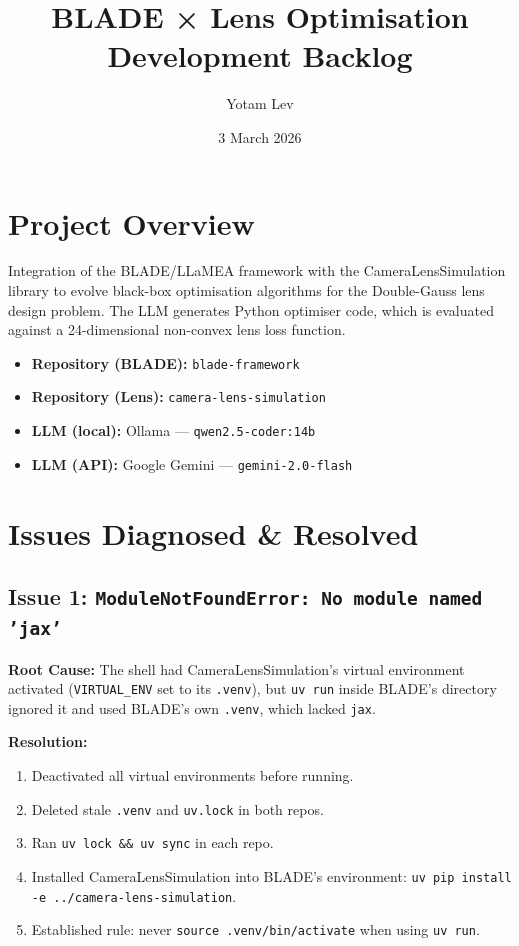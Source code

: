 \documentclass[a4paper,11pt]{article}
\title{\textbf{BLADE × Lens Optimisation} \\ Development Backlog}
\author{Yotam Lev}
\date{3 March 2026}
\begin{document}
\maketitle
\tableofcontents
\newpage

\section{Project Overview}

Integration of the BLADE/LLaMEA framework with the CameraLensSimulation
library to evolve black-box optimisation algorithms for the Double-Gauss
lens design problem. The LLM generates Python optimiser code, which is
evaluated against a 24-dimensional non-convex lens loss function.

\begin{itemize}
    \item \textbf{Repository (BLADE):} \texttt{blade-framework}
    \item \textbf{Repository (Lens):} \texttt{camera-lens-simulation}
    \item \textbf{LLM (local):} Ollama — \texttt{qwen2.5-coder:14b}
    \item \textbf{LLM (API):} Google Gemini — \texttt{gemini-2.0-flash}
\end{itemize}

\section{Issues Diagnosed \& Resolved}

\subsection{Issue 1: \texttt{ModuleNotFoundError: No module named 'jax'}}

\textbf{Root Cause:} The shell had CameraLensSimulation's virtual environment
activated (\texttt{VIRTUAL\_ENV} set to its \texttt{.venv}), but \texttt{uv run}
inside BLADE's directory ignored it and used BLADE's own \texttt{.venv}, which
lacked \texttt{jax}.

\textbf{Resolution:}
\begin{enumerate}
    \item Deactivated all virtual environments before running.
    \item Deleted stale \texttt{.venv} and \texttt{uv.lock} in both repos.
    \item Ran \texttt{uv lock \&\& uv sync} in each repo.
    \item Installed CameraLensSimulation into BLADE's environment:
          \texttt{uv pip install -e ../camera-lens-simulation}.
    \item Established rule: never \texttt{source .venv/bin/activate} when using
          \texttt{uv run}.
\end{enumerate}
\end{document}
